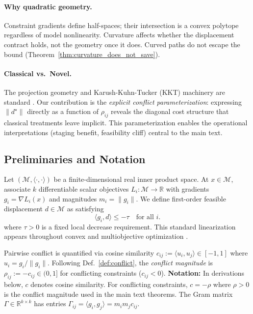 \documentclass{article}
\theoremstyle{plain}
\theoremstyle{definition}
\theoremstyle{remark}
\begin{document}
\paragraph{Why quadratic geometry.}
Constraint gradients define half-spaces; their intersection is a convex polytope regardless of model nonlinearity. Curvature affects whether the displacement contract holds, not the geometry once it does. Curved paths do not escape the bound (Theorem~\ref{thm:curvature_does_not_save}).

\paragraph{Classical vs.\ Novel.}
The projection geometry and Karush-Kuhn-Tucker (KKT) machinery are standard \citep{boyd2004convex, hornjohnson2013matrix}.
Our contribution is the \emph{explicit conflict parameterization}: expressing $\|d^\star\|$ directly as a function of $\rho_{ij}$ reveals the diagonal cost structure that classical treatments leave implicit. This parameterization enables the operational interpretations (staging benefit, feasibility cliff) central to the main text.

\subsection{Preliminaries and Notation}\label{app:prelim}

Let $(\mathcal{M},\langle \cdot, \cdot \rangle)$ be a finite-dimensional real inner product space.
At $x \in \mathcal{M}$, associate $k$ differentiable scalar objectives
$L_i : \mathcal{M} \to \mathbb{R}$ with gradients $g_i = \nabla L_i(x)$
and magnitudes $m_i = \|g_i\|$.
We define first-order feasible displacement $d \in \mathcal{M}$ as satisfying
\begin{equation}
\label{eq:firstorder}
\langle g_i, d \rangle \le -\tau \quad \text{for all } i.
\tag{F}
\end{equation}
where $\tau>0$ is a fixed local decrease requirement.
This standard linearization appears throughout convex and multiobjective optimization
\citep{fliege2000steepest, boyd2004convex}.

Pairwise conflict is quantified via cosine similarity $c_{ij} := \langle u_i, u_j \rangle \in [-1,1]$ where $u_i = g_i/\|g_i\|$.
Following Def.~\ref{def:conflict}, the \emph{conflict magnitude} is $\rho_{ij} := -c_{ij} \in (0,1]$ for conflicting constraints ($c_{ij} < 0$).
\textbf{Notation:} In derivations below, $c$ denotes cosine similarity. For conflicting constraints, $c = -\rho$ where $\rho > 0$ is the conflict magnitude used in the main text theorems.
The Gram matrix $\Gamma \in \mathbb{R}^{k \times k}$ has entries $\Gamma_{ij} = \langle g_i, g_j \rangle = m_i m_j c_{ij}$.
\end{document}
